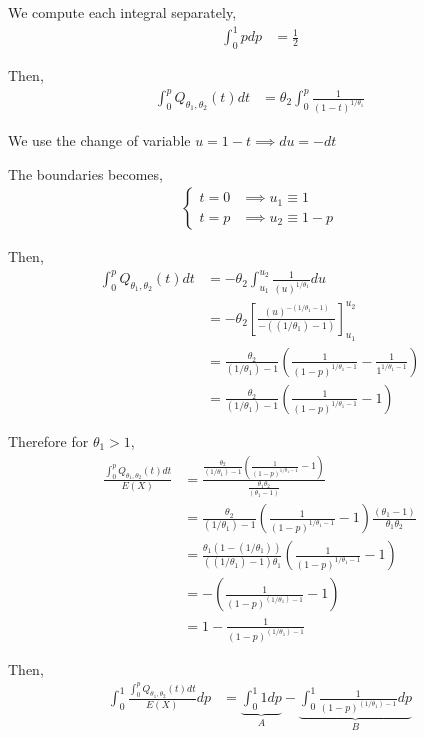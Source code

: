 \documentclass[10pt, a4paper, nofootinbib]{scrartcl}
\begin{document}
We compute each integral separately,
\begin{align*}
  \int_0^1 pdp 
    &= \frac{1}{2}
\end{align*}

Then,
\begin{align*}
  \int_0^p Q_{\theta_1, \theta_2}(t) dt 
    &= \theta_2 \int_0^p \frac{1}{(1 - t)^{1/\theta_1}}
\end{align*}

We use the change of variable $u = 1 - t \implies du = -dt$ 

The boundaries becomes, 
\begin{align*}
  \begin{cases}
    t = 0 &\implies u_1 \equiv 1 \\
    t = p &\implies u_2 \equiv 1 - p
  \end{cases}
\end{align*}

Then, 
\begin{align*}
  \int_0^p Q_{\theta_1, \theta_2}(t) dt 
    &= -\theta_2 \int_{u_1}^{u_2} \frac{1}{(u)^{1/\theta_1}} du \\
    &= -\theta_2 \left[ \frac{(u)^{-(1/\theta_1 - 1)}}{-((1/\theta_1) - 1)} \right]_{u_1}^{u_2} \\
    &= \frac{\theta_2}{(1/\theta_1) - 1} \left( \frac{1}{(1-p)^{1/\theta_1 - 1}} - \frac{1}{1^{1/\theta_1 - 1}} \right) \\
    &= \frac{\theta_2}{(1/\theta_1) - 1} \left( \frac{1}{(1-p)^{1/\theta_1 - 1}} - 1 \right)
\end{align*}

Therefore for $\theta_1 > 1$, 
\begin{align*}
  \frac{\int_{0}^{p} Q_{\theta_1, \theta_2}(t) dt}{E(X)}
    &= \frac{\frac{\theta_2}{(1/\theta_1) - 1} \left( \frac{1}{(1-p)^{1/\theta_1 - 1}} - 1 \right)}{\frac{\theta_1 \theta_2}{(\theta_1 - 1)}} \\
    &= \frac{\theta_2}{(1/\theta_1) - 1} \left( \frac{1}{(1-p)^{1/\theta_1 - 1}} - 1 \right) \frac{(\theta_1 - 1)}{\theta_1 \theta_2} \\
    &= \frac{\theta_1(1 - (1/\theta_1))}{((1/\theta_1) - 1)\theta_1} \left( \frac{1}{(1-p)^{1/\theta_1 - 1}} - 1 \right) \\
    &= - \left( \frac{1}{(1-p)^{(1/\theta_1) - 1}} - 1 \right) \\
    &= 1 - \frac{1}{(1-p)^{(1/\theta_1) - 1}}
\end{align*}

Then,
\begin{align*}
  \int_{0}^{1} \frac{\int_{0}^{p} Q_{\theta_1, \theta_2}(t) dt}{E(X)} dp 
    &= \underbrace{\int_0^1 1 dp}_{A} - \underbrace{\int_0^1 \frac{1}{(1-p)^{(1/\theta_1) - 1}} dp}_{B}
\end{align*}
\end{document}
